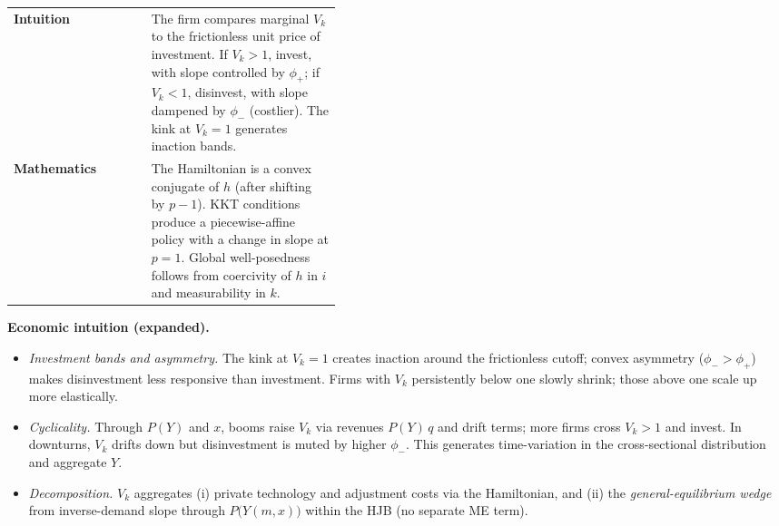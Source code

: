 ﻿\documentclass[11pt,letterpaper,oneside]{article}
\numberwithin{equation}{section}
\newcommand{\TableTighten}{\setlength{\tabcolsep}{5pt}\renewcommand{\arraystretch}{1.08}}
\newcommand{\TableTightBegin}{\begingroup\TableTighten}
\newcommand{\TableTightEnd}{\endgroup}
\newcommand{\1}{\mathbf{1}}
\begin{document}
\begin{tcolorbox}[didacticstyle]
\sloppy\footnotesize
\TableTightBegin
\begin{tabularx}{\linewidth}{@{} L{0.42\linewidth} Y @{}}
\textbf{Intuition} & The firm compares marginal $V_k$ to the frictionless unit price of investment. If $V_k>1$, invest, with slope controlled by $\phi_+$; if $V_k<1$, disinvest, with slope dampened by $\phi_-$ (costlier). The kink at $V_k=1$ generates inaction bands.\\
\textbf{Mathematics} & The Hamiltonian is a convex conjugate of $h$ (after shifting by $p-1$). KKT conditions produce a piecewise-affine policy with a change in slope at $p=1$. Global well-posedness follows from coercivity of $h$ in $i$ and measurability in $k$.
\end{tabularx}
\TableTightEnd
\end{tcolorbox}

\begin{tcolorbox}[didacticstyle]
\textbf{Economic intuition (expanded).}
\begin{itemize}[leftmargin=1.15em,itemsep=0.25em]
  \item \emph{Investment bands and asymmetry.} The kink at $V_k=1$ creates inaction around the frictionless cutoff; convex asymmetry ($\phi_->\phi_+$) makes disinvestment less responsive than investment. Firms with $V_k$ persistently below one slowly shrink; those above one scale up more elastically.
  \item \emph{Cyclicality.} Through $P(Y)$ and $x$, booms raise $V_k$ via revenues $P(Y)\,q$ and drift terms; more firms cross $V_k>1$ and invest. In downturns, $V_k$ drifts down but disinvestment is muted by higher $\phi_-$. This generates time-variation in the cross-sectional distribution and aggregate $Y$.
  \item \emph{Decomposition.} $V_k$ aggregates (i) private technology and adjustment costs via the Hamiltonian, and (ii) the \emph{general-equilibrium wedge} from inverse-demand slope through $P\big(Y(m,x)\big)$ within the HJB (no separate ME term).
\end{itemize}
\end{tcolorbox}
\end{document}
